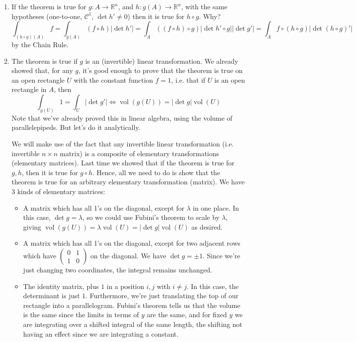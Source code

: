 \documentclass{article}
\DeclareMathOperator{\Vol}{vol}
\newcommand{\reals}[0]{\mathbb{R}}
\newcommand{\mc}[1]{\mathcal{#1}}
\begin{document}
\begin{enumerate}
  \item If the theorem is true for \(g : A \to \reals^n\), and \(h: g(A) \to \reals^n\), with the same hypotheses (one-to-one, \(\mc{C}^1\), \(\det h' \neq 0\)) then it is true for \(h \circ g\). Why?
  \begin{equation}
    \int_{(h \circ g)(A)}f = \int_{g(A)}(f \circ h)|\det h'| = \int_A((f \circ h) \circ g)|\det h' \circ g||\det g'| = \int_Af \circ (h \circ g)|\det (h \circ g)'|
  \end{equation}
  by the Chain Rule.
  \label{p3}


  \item The theorem is true if \(g\) is an (invertible) linear transformation. We already showed that, for any \(g\), it's good enough to prove that the theorem is true on an open rectangle \(U\) with the constant function \(f = 1\), i.e. that if \(U\) is an open rectangle in \(A\), then
  \begin{equation}
    \int_{g(U)}1 = \int_U|\det g'| \iff \Vol(g(U)) = |\det g|\Vol(U)
  \end{equation}
  Note that we've already proved this in linear algebra, using the volume of parallelepipeds. But let's do it analytically.

  We will make use of the fact that any invertible linear transformation (i.e. invertible \(n \times n\) matrix) is a composite of elementary transformations (elementary matrices). Last time we showed that if the theorem is true for \(g, h\), then it is true for \(g \circ h\). Hence, all we need to do is show that the theorem is true for an arbitrary elementary transformation (matrix). We have 3 kinds of elementary matrices:
  \begin{itemize}

    \item A matrix which has all 1's on the diagonal, except for \(\lambda\) in one place. In this case, \(\det g = \lambda\), so we could use Fubini's theorem to scale by \(\lambda\), giving \(\Vol(g(U)) = \lambda \Vol(U) = |\det g|\Vol(U)\) as desired.

    \item A matrix which has all 1's on the diagonal, except for two adjacent rows which have \(\begin{pmatrix} 0 & 1 \\ 1 & 0 \end{pmatrix}\) on the diagonal. We have \(\det g = \pm 1\). Since we're just changing two coordinates, the integral remains unchanged.

    \item The identity matrix, plus \(1\) in a position \(i, j\) with \(i \neq j\). In this case, the determinant is just \(1\). Furthermore, we're just translating the top of our rectangle into a parallelogram. Fubini's theorem tells us that the volume is the same since the limits in terms of \(y\) are the same, and for fixed \(y\) we are integrating over a shifted integral of the same length, the shifting not having an effect since we are integrating a constant.

  \end{itemize}
  \label{p4}


\end{enumerate}
\end{document}
